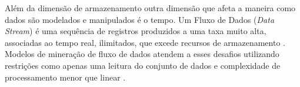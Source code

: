 Além da dimensão de armazenamento outra dimensão que afeta a maneira como dados
são modelados e manipulados é o tempo. Um Fluxo de Dados (\emph{Data Stream}) é
uma sequência de registros produzidos a uma taxa muito alta, associadas ao tempo
real, ilimitados, que excede recursos de armazenamento \cite{Gaber2005}.
Modelos de mineração de fluxo de dados atendem a esses desafios utilizando
restrições como apenas uma leitura do conjunto de dados e complexidade
de processamento menor que linear \cite{Gama2007, Gaber2005}.

 



% 
% 


